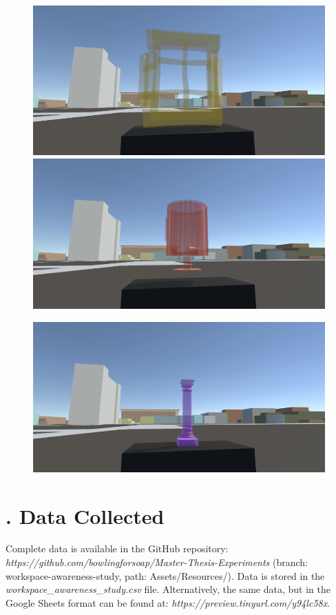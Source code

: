 \begin{appendices}
\begin{figure}
	\par \smallskip
	\includegraphics[width=0.9\linewidth]{figures/tracing_shapes/finalstudy_shapes11}
	\par \smallskip
	\includegraphics[width=0.9\linewidth]{figures/tracing_shapes/finalstudy_shapes12}
\end{figure}
\begin{figure}[t]
	\centering
	\includegraphics[width=0.9\linewidth]{figures/tracing_shapes/finalstudy_shapes13}
\end{figure}


\chapter{. Data Collected}
\label{app:final_study_data_collected}
Complete data is available in the GitHub repository: \textit{https://github.com/bowlingforsoap/Master-Thesis-Experiments} (branch: workspace-awareness-study, path: Assets/Resources/). Data is stored in the \textit{workspace\_awareness\_study.csv} file. Alternatively, the same data, but in the Google Sheets format can be found at: \textit{https://preview.tinyurl.com/y94lc58x}.


\end{appendices}
